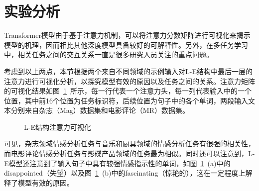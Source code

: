 \section{实验分析}
\label{sec:analysis}
Transformer模型由于基于注意力机制，可以将注意力分数矩阵进行可视化来揭示模型的机理，因而相比其他深度模型具备较好的可解释性。另外，在多任务学习中，相关任务之间的交互关系一直是很多研究人员关注的重点问题。

考虑到以上两点，本节根据两个来自不同领域的示例输入对L-E结构中最后一层的注意力进行可视化分析，以探究模型有效的原因以及任务之间的关系。注意力矩阵的可视化结果如图~\ref{fig:l-e-attn}~所示，每一行代表一个注意力头，每一列代表输入中的一个位置，其中前16个位置为任务标识符，后续位置为句子中的各个单词，两段输入文本分别来自杂志（Mag）数据集和电影评论（MR）数据集。

\begin{figure}[htb]
\centering


\caption{L-E结构注意力可视化}
\label{fig:l-e-attn}
\end{figure}

可见，杂志领域情感分析任务与音乐和厨具领域的情感分析任务有很强的相关性，而电影评论情感分析任务与影碟产品领域的任务最为相似。同时还可以注意到，L-E模型还注意到了输入句子中具有较强情感指示性的单词，如图~\ref{fig:l-e-attn}~(a)中的disappointed（失望）以及图~\ref{fig:l-e-attn}~(b)中的fascinating（惊艳的），这在一定程度上解释了模型有效的原因。